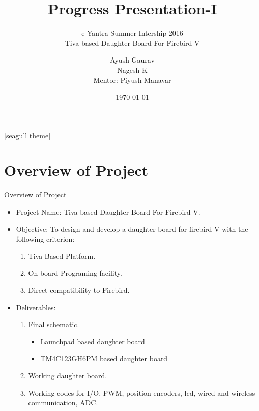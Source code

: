 \documentclass[10pt, a4paper]{beamer}
\begin{document}
	\title{Progress Presentation-I}
	\subtitle{e-Yantra Summer Intership-2016 \\ Tiva based Daughter Board For Firebird V}
	\author{Ayush Gaurav \\Nagesh K \\ Mentor: Piyush Manavar}
	\date{\today}
	\frame{\titlepage}

[seagull theme]
\section{Overview of Project}
\begin{frame}{Overview of Project}
	\begin{itemize}
		\item Project Name: Tiva based Daughter Board For Firebird V.
		\item Objective: To design and develop a daughter board for firebird V with the following criterion:
			\begin{enumerate}
				\item Tiva Based Platform.
				\item On board Programing facility.
				\item Direct compatibility to Firebird.
			\end{enumerate}
		\item Deliverables:
		\begin{enumerate}
			\item Final schematic.\begin{itemize}
				\item Launchpad based daughter board 
				\item TM4C123GH6PM based daughter board
			\end{itemize}
			\item Working daughter board.
			\item Working codes for I/O, PWM, position encoders, lcd, wired and wireless communication, ADC.
		\end{enumerate}
	\end{itemize}
\end{frame}
\end{document}

